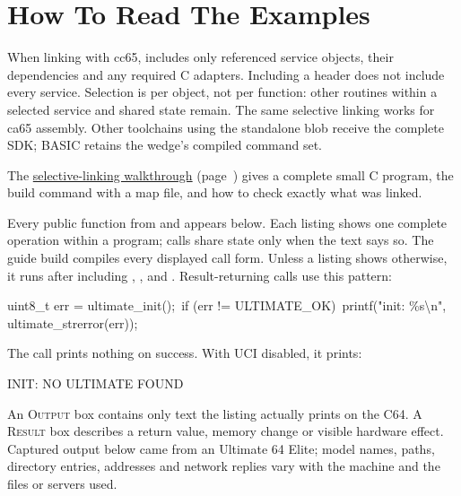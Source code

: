 

\section{How To Read The Examples}

When linking with cc65,  includes only referenced service
objects, their dependencies and any required C adapters. Including a header
does not include every service. Selection is per object, not per function:
other routines within a selected service and shared state remain. The same
selective linking works for ca65 assembly. Other toolchains using the
standalone blob receive the complete SDK; BASIC retains the wedge's compiled
command set.

The \hyperref[sec:selective-linking]{selective-linking walkthrough}
(page~\pageref{sec:selective-linking}) gives a complete small C program, the
build command with a map file, and how to check exactly what was linked.

Every public function from  and  appears below.
Each listing shows one complete operation within a program; calls share state
only when the text says so. The guide build compiles every displayed call form.
Unless a listing shows otherwise, it runs after including , ,
 and . Result-returning calls use this pattern:

\begin{listingbox}
uint8\_t err = ultimate\_init();\
if (err != ULTIMATE\_OK)\
\hspace*{1em}printf("init: \%s\textbackslash n", ultimate\_strerror(err));
\end{listingbox}
The call prints nothing on success. With UCI disabled, it prints:

\begin{outputbox}
INIT: NO ULTIMATE FOUND
\end{outputbox}

An \textsc{Output} box contains only text the listing actually prints on the
C64. A \textsc{Result} box describes a return value, memory change or visible
hardware effect. Captured output below came from an Ultimate 64 Elite; model
names, paths, directory entries, addresses and network replies vary with the
machine and the files or servers used.

